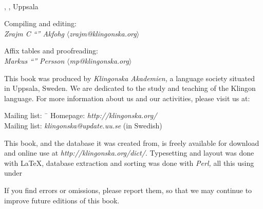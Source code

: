 %
\begin{center}
  \\
  \edition{}, \compiledate{}, Uppsala

  \vspace{4mm}
  \small Compiling and editing: \\
  \textit{Zrajm C ``'' Akfohg}
  $\langle$\textit{zrajm@klingonska.org}$\rangle$ 

  \vspace{2mm}
  Affix tables and proofreading:\\
  \textit{Markus ``'' Persson}
  $\langle$\textit{mp@klingonska.org}$\rangle$
\end{center}


\small\noindent This book was produced by \textit{Kling\-on\-ska
Aka\-demi\-en,} a language society situated in Uppsala, Sweden. We are
dedicated to the study and teaching of the Klingon language. For more
information about us and our activities, please visit us at:

\begin{tabbing}
\indent Mailing list: \ \= \kill
\indent Homepage: \> \textit{http://klingonska.org/}\\
\indent Mailing list: \> \textit{klingonska@update.uu.se} (in Swedish)
\end{tabbing}

\noindent This book, and the database it was created from, is freely available
for download and online use at \textit{http://klingonska.org/dict/}.
Typesetting and layout was done with \LaTeX, database extraction and sorting
was done with \textit{Perl,} all this using  under 

If you find errors or omissions, please report them, so that we may continue to
improve future editions of this book.

\newpage
\normalsize
